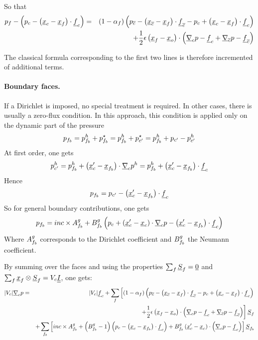 So that
\begin{align*}
  p_{f}-\left(p_{c}-\left({\underline{x}_{c}}-\underline{x}_{{f}}\right)\cdot\underline{f}_{c}\right)&=&\left(1-\alpha_{{f}}\right)\left(p_{{\overline{c}}}-\left(\underline{x}_{{\overline{c}}}-\underline{x}_{{f}}\right)\cdot\underline{f}_{{\overline{c}}}-p_{c}+\left({\underline{x}_{c}}-\underline{x}_{{f}}\right)\cdot\underline{f}_{c}\right) \\ &&+\frac{1}{2}\epsilon\left(\underline{x}_{{f}}-\underline{x}_o\right)\cdot\left(\underline{\nabla}_{c}{p}-\underline{f}_{c}+\underline{\nabla}_{{\overline{c}}}{p}-\underline{f}_{{\overline{c}}}\right)
\end{align*}

The classical formula corresponding to the first two lines is therefore incremented
of additional terms.

\paragraph{Boundary faces.} If a Dirichlet is imposed, no special treatment is
required. In other cases, there is usually a zero-flux condition. In this
approach, this condition is applied only on the dynamic part of the pressure
\begin{equation}
	p_{{{f}_{b}}}=p_{{{f}_{b}}}^{h}+p_{{{f}_{b}}}^\star=p_{{{f}_{b}}}^{h}+p_{c^\prime}^\star=p_{{{f}_{b}}}^{h}+p_{c^\prime}-p_{c^\prime}^{h}
\end{equation}
At first order, one gets
\begin{equation}
	p_{c^\prime}^{h}=p_{{{f}_{b}}}^{h}+\left(\underline{x}_{c}^\prime-\underline{x}_{{{f}_{b}}}\right)\cdot\underline{\nabla}_{c}{p}^{h}=p_{{{f}_{b}}}^{h}+\left(\underline{x}_{c}^\prime-\underline{x}_{{{f}_{b}}}\right)\cdot\underline{f}_{c}
\end{equation}
Hence
\begin{equation}
	p_{{{f}_{b}}}=p_{c^\prime}-\left(\underline{x}_{c}^\prime-\underline{x}_{{{f}_{b}}}\right)\cdot\underline{f}_{c}
\end{equation}
So for general boundary contributions, one gets
\begin{equation}
  p_{{{f}_{b}}}=inc\times A^{g}_{{{f}_{b}}}+B^{g}_{{{f}_{b}}}\left(p_{c}+\left(\underline{x}_{c}^\prime-{\underline{x}_{c}}\right)\cdot\underline{\nabla}_{c}p-\left(\underline{x}_{c}^\prime-\underline{x}_{{{f}_{b}}}\right)\cdot\underline{f}_{c}\right)
\end{equation}
Where $A^{g}_{{{f}_{b}}}$ corresponds to the Dirichlet coefficient and $B^{g}_{{{f}_{b}}}$
the Neumann coefficient.

By summing over the faces and using the properties
$\sum_{{f}}\underline{S}_{{f}}=\underline{0}$ and
$\sum_{{f}}\underline{x}_{{f}}\otimes\underline{S}_{{f}}=V_{c}\underline{\underline{I}}$,
one gets:
\begin{align*}
  |V_{c}|\underline{\nabla}_{c}p&=&|V_{c}|\underline{f}_{c}+\sum_{f}\left[\left(1-\alpha_{{f}}\right)\left(p_{{\overline{c}}}-\left(\underline{x}_{{\overline{c}}}-\underline{x}_{{f}}\right)\cdot\underline{f}_{{\overline{c}}}-p_{c}+\left({\underline{x}_{c}}-\underline{x}_{{f}}\right)\cdot\underline{f}_{c}\right)\right. \\ &&\left.+\frac{1}{2}\epsilon\left(\underline{x}_{{f}}-\underline{x}_o\right)\cdot\left(\underline{\nabla}_{c}{p}-\underline{f}_{c}+\underline{\nabla}_{{\overline{c}}}{p}-\underline{f}_{{\overline{c}}}\right)\right]\underline{S}_{{f}}
  \\ &&+\sum_{{{f}_{b}}}\left[inc\times A^{g}_{{{f}_{b}}}+\left(B^{g}_{{{f}_{b}}}-1\right)\left(p_{c}-\left({\underline{x}_{c}}-\underline{x}_{{{f}_{b}}}\right)\cdot\underline{f}_{c}\right)+B^{g}_{{{f}_{b}}}\left(\underline{x}_{c}^\prime-{\underline{x}_{c}}\right)\cdot\left(\underline{\nabla}_{c}p-\underline{f}_{c}\right)\right]\underline{S}_{{{f}_{b}}}
\end{align*}


